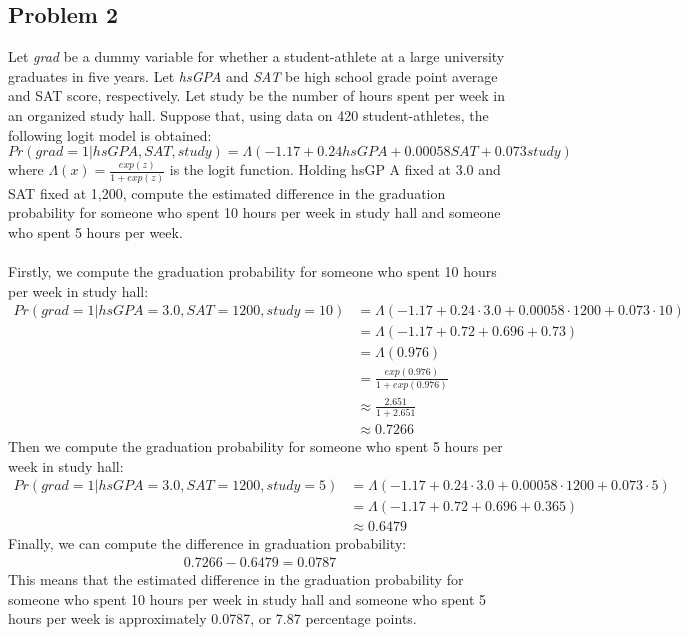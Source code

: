 \documentclass[12pt]{article}
\begin{document}
\begin{flushleft}
\subsection*{Problem 2}
Let \textit{grad} be a dummy variable for whether a student-athlete at a large university graduates in five years. Let \textit{hsGPA} and \textit{SAT} be high school grade point average and SAT score, respectively. Let study be the number of hours spent per week in an organized study hall. Suppose that, using data on 420 student-athletes, the following logit model is obtained:
\[
Pr(grad=1|hsGPA, SAT, study) = \Lambda(-1.17 + 0.24hsGPA + 0.00058SAT + 0.073study)
\]
where $\Lambda(x) = \frac{exp(z)}{1+exp(z)}$ is the logit function. Holding hsGP A fixed at 3.0 and SAT fixed at 1,200, compute the estimated difference in the graduation probability for someone who spent 10 hours per week in study hall and someone who spent 5 hours per week.\\~\\
Firstly, we compute the graduation probability for someone who spent 10 hours per week in study hall:
\begin{align*}
Pr(grad=1|hsGPA=3.0, SAT=1200, study=10) &= \Lambda(-1.17 + 0.24 \cdot 3.0 + 0.00058 \cdot 1200 + 0.073 \cdot 10)\\
&= \Lambda(-1.17 + 0.72 + 0.696 + 0.73)\\
&= \Lambda(0.976)\\
&= \frac{exp(0.976)}{1+exp(0.976)}\\
&\approx \frac{2.651}{1+2.651}\\
&\approx 0.7266
\end{align*}
Then we compute the graduation probability for someone who spent 5 hours per week in study hall:
\begin{align*}
Pr(grad=1|hsGPA=3.0, SAT=1200, study=5) &= \Lambda(-1.17 + 0.24 \cdot 3.0 + 0.00058 \cdot 1200 + 0.073 \cdot 5)\\
&= \Lambda(-1.17 + 0.72 + 0.696 + 0.365)\\
& \approx 0.6479
\end{align*}
Finally, we can compute the difference in graduation probability:
\begin{align*}
0.7266 - 0.6479 = 0.0787
\end{align*}
This means that the estimated difference in the graduation probability for someone who spent 10 hours per week in study hall and someone who spent 5 hours per week is approximately 0.0787, or 7.87 percentage points.\\~\\

\end{flushleft}
\end{document}
